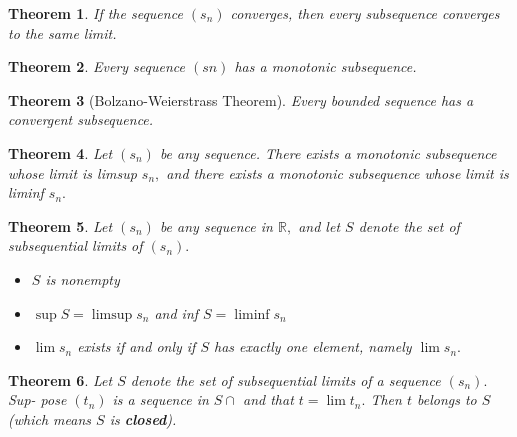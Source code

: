 \documentclass[12pt]{article}
\newtheorem{theorem}{Theorem}[section]
\begin{document}
\begin{theorem}
	If the sequence $\left( s _ { n } \right)$ converges, then every subsequence converges to
	the same limit.
\end{theorem}

\begin{theorem}
	Every sequence $(sn)$ has a monotonic subsequence.
\end{theorem}

\begin{theorem}[Bolzano-Weierstrass Theorem]
	Every bounded sequence has a convergent subsequence.
\end{theorem} 
\begin{theorem}
	Let $\left( s _ { n } \right)$ be any sequence. There exists a monotonic subsequence
	whose limit is limsup $s _ { n } ,$ and there exists a monotonic subsequence
	whose limit is liminf $s _ { n } .$
\end{theorem}

\begin{theorem}
	Let $\left( s _ { n } \right)$ be any sequence in $\mathbb { R } ,$ and let $S$ denote the set of
	subsequential limits of $\left( s _ { n } \right) .$
	\begin{itemize}
		\item $S$ is nonempty
		\item $\sup S = \limsup s _ { n }$ and inf $S = \liminf s _ { n }$
		\item $\lim s _ { n }$ exists if and only if $S$ has exactly one element, namely $\lim s _ { n } .$
	\end{itemize}
\end{theorem}

\begin{theorem}
	Let $S$ denote the set of subsequential limits of a sequence $\left( s _ { n } \right) .$ Sup-
	pose $\left( t _ { n } \right)$ is a sequence in $S \cap$ and that $t = \lim t _ { n } .$ Then $t$ belongs
	to $S $ (which means $S$ is \textbf{closed}).
\end{theorem}
\end{document}
